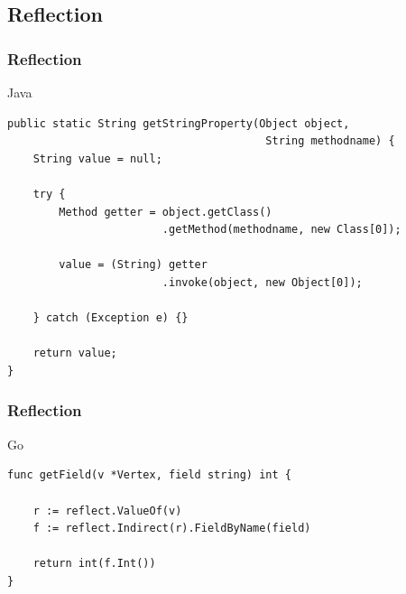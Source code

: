\documentclass{beamer}
\begin{document}

\subsection{Reflection}
\begin{frame}[fragile]
\frametitle{Reflection}

Java
\lstset{language=Java}
\begin{lstlisting}
public static String getStringProperty(Object object, 
                                        String methodname) {
    String value = null;

    try {
        Method getter = object.getClass()
                        .getMethod(methodname, new Class[0]);

        value = (String) getter
                        .invoke(object, new Object[0]);

    } catch (Exception e) {}

    return value;
}
\end{lstlisting}

\end{frame}

\begin{frame}[fragile]
\frametitle{Reflection}

Go
\begin{lstlisting}
func getField(v *Vertex, field string) int {

    r := reflect.ValueOf(v)
    f := reflect.Indirect(r).FieldByName(field)

    return int(f.Int())
}
\end{lstlisting}

\end{frame}
\end{document}
